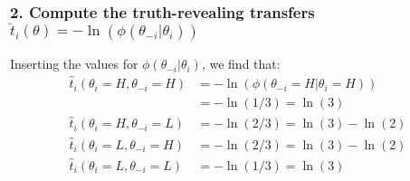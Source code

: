 \documentclass[a4paper]{article}
\begin{document}
	
	\subsubsection*{2. Compute the truth-revealing transfers $\hat{t}_{i}(\theta)=-\ln(\phi(\theta_{-i}|\theta_{i}))$}
	Inserting the values for $\phi(\theta_{-i}|\theta_{i})$, we find that:
	\begin{align}
		\hat{t}_{i}(\theta_{i}=H,\theta_{-i}=H)&=-\ln(\phi(\theta_{-i}=H|\theta_{i}=H)) \nonumber \\ 
		&= -\ln(1/3) = \ln(3)\\
		\hat{t}_{i}(\theta_{i}=H,\theta_{-i}=L)&=-\ln(2/3)=\ln(3)-\ln(2)\\
		\hat{t}_{i}(\theta_{i}=L,\theta_{-i}=H)&=-\ln(2/3)=\ln(3)-\ln(2)\\
		\hat{t}_{i}(\theta_{i}=L,\theta_{-i}=L)&=-\ln(1/3)=\ln(3)
	\end{align}
	
	
\end{document}
